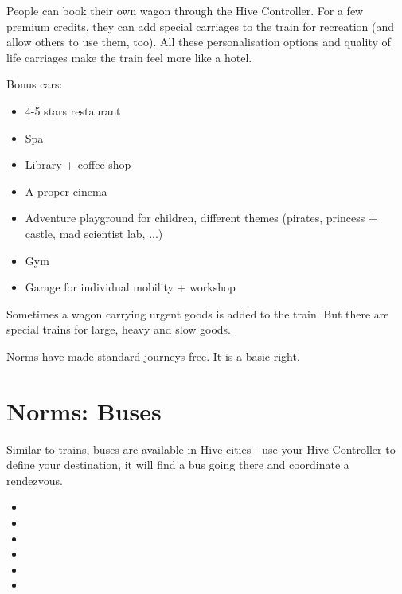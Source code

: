 People can book their own wagon through the Hive Controller. For a few premium credits, they can add special carriages to the train for recreation (and allow others to use them, too). All these personalisation options and quality of life carriages make the train feel more like a hotel.

Bonus cars:

\begin{itemize}
    \item 4-5 stars restaurant
    \item Spa
    \item Library + coffee shop
    \item A proper cinema
    \item Adventure playground for children, different themes (pirates, princess + castle, mad scientist lab, ...)
    \item Gym
    \item Garage for individual mobility + workshop
\end{itemize}

Sometimes a wagon carrying urgent goods is added to the train. But there are special trains for large, heavy and slow goods.

Norms have made standard journeys free. It is a basic right.

\section{Norms: Buses}

Similar to trains, buses are available in Hive cities - use your Hive Controller to define your destination, it will find a bus going there and coordinate a rendezvous.

\begin{normtalk}[title=This bus is haunted]
    \begin{itemize}
        \item {}
        \item {}
        \item {}
        \item {}
        \item {}
        \item {}
    \end{itemize}
\end{normtalk}

